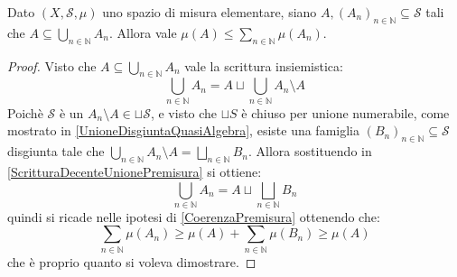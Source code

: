 \begin{lemma}\label{PiuCheMonotonaPremisura}
	Dato $(X,\mathcal S,\mu)$ uno spazio di misura elementare, siano $A,(A_n)_{n\in\mathbb N}\subseteq \mathcal S$ tali che $A\subseteq\bigcup_{n\in\mathbb N}A_n$.
	Allora vale $\mu(A)\le \sum_{n\in\mathbb N}\mu(A_n)$.
\end{lemma}
\begin{proof}
	Visto che $A\subseteq\bigcup_{n\in\mathbb N}A_n$ vale la scrittura insiemistica:
	\begin{equation}\label{ScritturaDecenteUnionePremisura}
		\bigcup_{n\in\mathbb N}A_n=A\sqcup\bigcup_{n\in\mathbb N}A_n\setminus A
	\end{equation}
	Poichè $\mathcal S$ è un \semiring{} $A_n\setminus A\in \sqcup \mathcal S$, e visto che $\sqcup S$ è chiuso per unione numerabile, come mostrato in \cref{UnioneDisgiuntaQuasiAlgebra}, esiste una famiglia $(B_n)_{n\in\mathbb N}\subseteq\mathcal S$ disgiunta tale che $\bigcup_{n\in\mathbb N}A_n\setminus A=\bigsqcup_{n\in\mathbb N}B_n$.
	Allora sostituendo in \cref{ScritturaDecenteUnionePremisura} si ottiene:
	\begin{equation*}
		\bigcup_{n\in\mathbb N}A_n=A\sqcup\bigsqcup_{n\in\mathbb N}B_n
	\end{equation*}
	quindi si ricade nelle ipotesi di \cref{CoerenzaPremisura} ottenendo che:
	\begin{equation*}
		\sum_{n\in\mathbb N}\mu(A_n)\ge \mu(A)+\sum_{n\in\mathbb N}\mu(B_n)\ge \mu(A)
	\end{equation*}
	che è proprio quanto si voleva dimostrare.

\end{proof}



